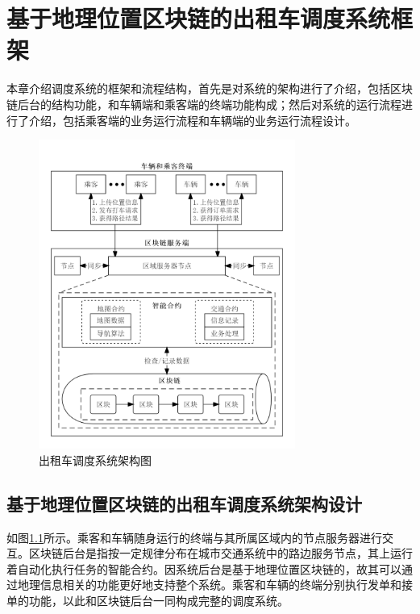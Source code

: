 \chapter{基于地理位置区块链的出租车调度系统框架}

本章介绍调度系统的框架和流程结构，首先是对系统的架构进行了介绍，包括区块链后台的结构功能，和车辆端和乘客端的终端功能构成；然后对系统的运行流程进行了介绍，包括乘客端的业务运行流程和车辆端的业务运行流程设计。

\begin{figure}[h]
  \centering
  \includegraphics[width=0.75\textwidth]{figures/structure}
  \caption{出租车调度系统架构图}\label{fig:structure}
\end{figure}

\section{基于地理位置区块链的出租车调度系统架构设计}
如图\ref{fig:structure}所示。乘客和车辆随身运行的终端与其所属区域内的节点服务器进行交互。区块链后台是指按一定规律分布在城市交通系统中的路边服务节点，其上运行着自动化执行任务的智能合约。因系统后台是基于地理位置区块链的，故其可以通过地理信息相关的功能更好地支持整个系统。乘客和车辆的终端分别执行发单和接单的功能，以此和区块链后台一同构成完整的调度系统。

